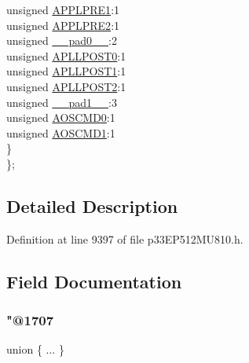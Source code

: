 \begin{DoxyCompactItemize}
\begin{tabbing}
\>\>unsigned \hyperlink{structtag_a_c_l_k_c_o_n3_b_i_t_s_a258d069d41f1ef615c93caf6095068d3}{APPLPRE1}:1\\
\>\>unsigned \hyperlink{structtag_a_c_l_k_c_o_n3_b_i_t_s_ac0e146689c1cdc2d02efa5a2b353d206}{APPLPRE2}:1\\
\>\>unsigned \hyperlink{structtag_a_c_l_k_c_o_n3_b_i_t_s_adf71f3d8410c1f1dbbc96680a92c49af}{\_\_pad0\_\_}:2\\
\>\>unsigned \hyperlink{structtag_a_c_l_k_c_o_n3_b_i_t_s_a6ccf3f4130829606d9f33c837aacf89b}{APLLPOST0}:1\\
\>\>unsigned \hyperlink{structtag_a_c_l_k_c_o_n3_b_i_t_s_a563c618c8a221482b76a6bfe96934b25}{APLLPOST1}:1\\
\>\>unsigned \hyperlink{structtag_a_c_l_k_c_o_n3_b_i_t_s_aaa885767095007effed882490cd3a44f}{APLLPOST2}:1\\
\>\>unsigned \hyperlink{structtag_a_c_l_k_c_o_n3_b_i_t_s_acaf2d0924a107ec6e8d2e31febaf66f9}{\_\_pad1\_\_}:3\\
\>\>unsigned \hyperlink{structtag_a_c_l_k_c_o_n3_b_i_t_s_a2606813597f57ba6fe2ea604aa53265f}{AOSCMD0}:1\\
\>\>unsigned \hyperlink{structtag_a_c_l_k_c_o_n3_b_i_t_s_a2bba4614fa21a24e5743422614f32e61}{AOSCMD1}:1\\
\>\} \\
\}; \\

\end{tabbing}\end{DoxyCompactItemize}


\subsection{Detailed Description}


Definition at line 9397 of file p33\+E\+P512\+M\+U810.\+h.



\subsection{Field Documentation}
\mbox{\label{structtag_a_c_l_k_c_o_n3_b_i_t_s_a19594731fb778417c5e7d9d4158e86e8}} 
\subsubsection{\texorpdfstring{"@1707}{@1707}}
{\footnotesize\ttfamily union \{ ... \} }

